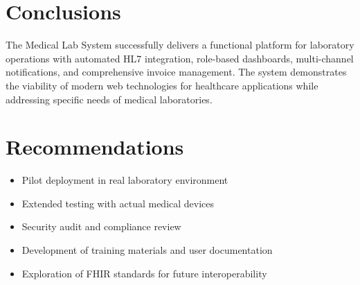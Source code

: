 \documentclass[12pt, a4paper]{report}
\begin{document}
\section{Conclusions}
The Medical Lab System successfully delivers a functional platform for laboratory operations with automated HL7 integration, role-based dashboards, multi-channel notifications, and comprehensive invoice management. The system demonstrates the viability of modern web technologies for healthcare applications while addressing specific needs of medical laboratories.

\section{Recommendations}
\begin{itemize}
    \item Pilot deployment in real laboratory environment
    \item Extended testing with actual medical devices
    \item Security audit and compliance review
    \item Development of training materials and user documentation
    \item Exploration of FHIR standards for future interoperability
\end{itemize}
\end{document}
